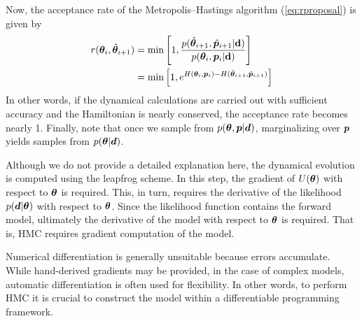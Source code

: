 Now, the acceptance rate of the Metropolis–Hastings algorithm (\ref{eq:rproposal}) is given by
\begin{align}
r({\boldsymbol{\theta}}_i,\hat{\boldsymbol{\theta}}_{i+1}) &= \mathrm{min} \left[1, \frac{p(\hat{\boldsymbol{\theta}}_{i+1},\hat{\boldsymbol{p}}_{i+1}|{\bf d}) }{p({\boldsymbol{\theta}}_{i},{\boldsymbol{p}}_{i}|{\bf d}) } \right] \\
 &= \mathrm{min} \left[1, e^{H({\boldsymbol{\theta}}_{i},{\boldsymbol{p}}_{i}) - H(\hat{\boldsymbol{\theta}}_{i+1},\hat{\boldsymbol{p}}_{i+1})}  \right]
\end{align}
In other words, if the dynamical calculations are carried out with sufficient accuracy and the Hamiltonian is nearly conserved, the acceptance rate becomes nearly 1.
Finally, note that once we sample from $p(\boldsymbol{\theta}, \boldsymbol{p}|\boldsymbol{d})$, marginalizing over $\boldsymbol{p}$ yields samples from $p(\boldsymbol{\theta}|\boldsymbol{d})$.

Although we do not provide a detailed explanation here, the dynamical evolution is computed using the leapfrog scheme. In this step, the gradient of $U(\boldsymbol{\theta})$ with respect to $\boldsymbol{\theta}$ is required. This, in turn, requires the derivative of the likelihood $p(\boldsymbol{d}|\boldsymbol{\theta})$ with respect to $\boldsymbol{\theta}$. Since the likelihood function contains the forward model, ultimately the derivative of the model with respect to $\boldsymbol{\theta}$ is required. That is, HMC requires gradient computation of the model.

Numerical differentiation is generally unsuitable because errors accumulate. While hand-derived gradients may be provided, in the case of complex models, automatic differentiation is often used for flexibility. In other words, to perform HMC it is crucial to construct the model within a differentiable programming framework.
